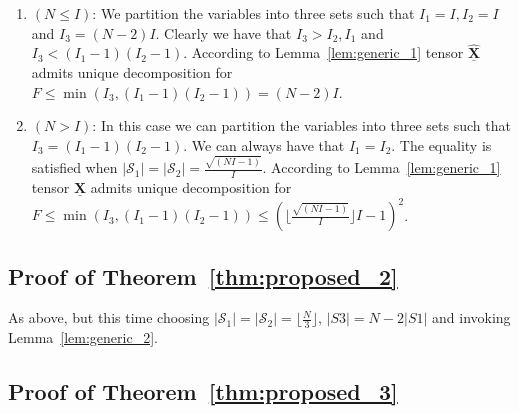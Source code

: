 \documentclass[journal]{IEEEtran}
\begin{document}
\begin{appendices}
\begin{enumerate}[leftmargin=*]
\item  { $ {(N \leq I)}$}: We partition the variables into three sets such that $I_1 = I, I_2 = I$ and $I_3 = (N-2)I$. Clearly we have that $I_3 > I_2,I_1 $ and $I_3 < (I_1-1)(I_2-1)$. According to Lemma~\ref{lem:generic_1} tensor $\underline{\widehat{\mathbf{X}}}$ admits unique decomposition 
for $F\leq \min \left(I_3,(I_1-1)(I_2-1) \right) = (N-2)I$.
\item  { $ {(N>I)}$}: In this case we can partition the variables into three sets such that $I_3 = (I_1-1)(I_2-1)$. We can always have that $I_1 = I_2$. The equality is satisfied when $ |\mathcal{S}_1| = |\mathcal{S}_2|= \frac{\sqrt{(NI-1)}}{I}$. According to Lemma~\ref{lem:generic_1} tensor $\underline{\widehat{\mathbf{X}}}$ admits unique decomposition for $F\leq \min (I_3,(I_1-1)(I_2-1)) \leq ( \lfloor \frac{\sqrt{(NI-1)}}{I}\rfloor I -1)^2 $.
\end{enumerate}

\subsection{Proof of Theorem~\ref{thm:proposed_2}}
\label{ap:ident_results1}
As above, but this time choosing $|\mathcal{S}_1| = |\mathcal{S}_2| = \lfloor \frac{N}{3} \rfloor$,  {$|S3| = N - 2|S1|$} and invoking Lemma~\ref{lem:generic_2}.

\subsection{Proof of Theorem~\ref{thm:proposed_3}}
\label{ap:ident_results2}


\end{appendices}
\end{document}
